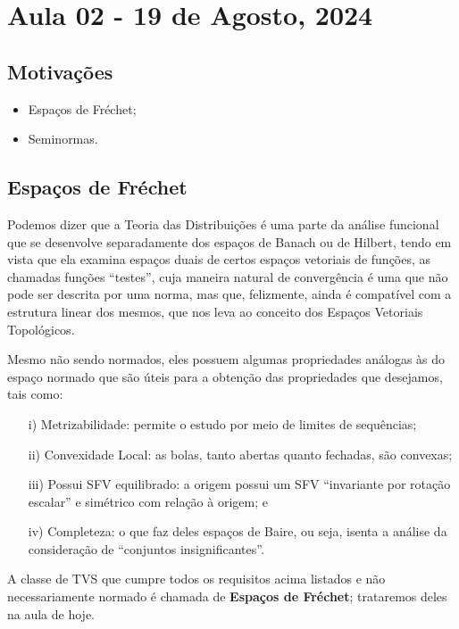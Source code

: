 \documentclass[../distribution_theory_notes.tex]{subfiles}
\begin{document}
\section{Aula 02 - 19 de Agosto, 2024}
\subsection{Motivações}
\begin{itemize}
	\item Espaços de Fréchet;
	\item Seminormas.
\end{itemize}
\subsection{Espaços de Fréchet}
Podemos dizer que a Teoria das Distribuições é uma parte da análise funcional que se desenvolve separadamente dos espaços de Banach ou de Hilbert, tendo em vista que ela examina espaços duais de certos espaços vetoriais de funções, as chamadas funções ``testes'', cuja maneira natural de convergência é uma que não pode ser descrita por uma norma, mas que, felizmente, ainda é compatível com a estrutura linear dos mesmos, que nos leva ao conceito dos Espaços Vetoriais Topológicos. 

Mesmo não sendo normados, eles possuem algumas propriedades análogas às do espaço normado que são úteis para a obtenção das propriedades que desejamos, tais como: 
\begin{itemize}
  \item[i)] Metrizabilidade: permite o estudo por meio de limites de sequências;
  \item[ii)] Convexidade Local: as bolas, tanto abertas quanto fechadas, são convexas;
  \item[iii)] Possui SFV equilibrado: a origem possui um SFV ``invariante por rotação escalar'' e simétrico com relação à origem; e 
  \item[iv)] Completeza: o que faz deles espaços de Baire, ou seja, isenta a análise da consideração de ``conjuntos insignificantes''. 
\end{itemize}
A classe de TVS que cumpre todos os requisitos acima listados e não necessariamente normado é chamada de \textbf{Espaços de Fréchet}; trataremos deles na aula de hoje.
\end{document}

